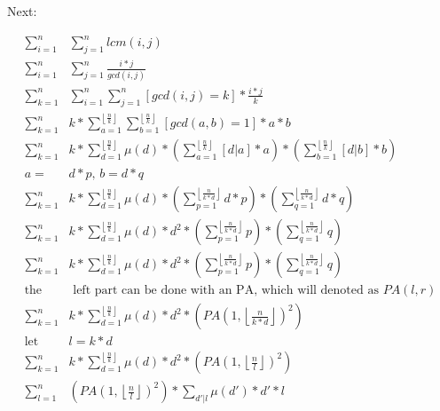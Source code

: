             Next:

            \begin{align*}
                \sum_{i=1}^{n}& \sum_{j=1}^{n} lcm(i,j) \\
                \sum_{i=1}^{n}& \sum_{j=1}^{n} \frac{i*j}{gcd(i,j)} \\
                \sum_{k=1}^{n}& \sum_{i=1}^{n} \sum_{j=1}^{n} [gcd(i,j) = k]*\frac{i*j}{k} \\
                \sum_{k=1}^{n}& k * \sum_{a=1}^{\left\lfloor \frac{n}{k} \right\rfloor} 
                \sum_{b=1}^{\left\lfloor \frac{n}{k} \right\rfloor} [gcd(a,b) = 1]*a*b \\
                \sum_{k=1}^{n}& k * \sum_{d = 1}^{\left\lfloor \frac{n}{k} \right\rfloor} \mu(d) * (\sum_{a=1}^{\left\lfloor \frac{n}{k} \right\rfloor}[d|a]*a) * ( 
                \sum_{b=1}^{\left\lfloor \frac{n}{k} \right\rfloor} [d|b]*b) \\
                a =& d*p\text{, }b = d*q\\
                \sum_{k=1}^{n}& k * \sum_{d = 1}^{\left\lfloor \frac{n}{k} \right\rfloor} \mu(d) * (\sum_{p=1}^{\left\lfloor \frac{n}{k*d} \right\rfloor}d*p) * ( 
                \sum_{q=1}^{\left\lfloor \frac{n}{k*d} \right\rfloor} d*q) \\
            \sum_{k=1}^{n}& k * \sum_{d = 1}^{\left\lfloor \frac{n}{k} \right\rfloor} \mu(d) * d^2 * (\sum_{p=1}^{\left\lfloor \frac{n}{k*d} \right\rfloor}p) * ( 
                \sum_{q=1}^{\left\lfloor \frac{n}{k*d} \right\rfloor} q) \\
                \sum_{k=1}^{n}& k * \sum_{d = 1}^{\left\lfloor \frac{n}{k} \right\rfloor} \mu(d) * d^2 * (\sum_{p=1}^{\left\lfloor \frac{n}{k*d} \right\rfloor}p) * ( 
                \sum_{q=1}^{\left\lfloor \frac{n}{k*d} \right\rfloor} q) \\
                \text{the}&\text{ left part can be done with an PA, which will denoted as } PA(l,r)\\
                \sum_{k=1}^{n}& k * \sum_{d = 1}^{\left\lfloor \frac{n}{k} \right\rfloor} \mu(d) * d^2 * (PA(1,\left\lfloor \frac{n}{k*d} \right\rfloor)^2)  \\
                \text{let }& l = k*d\\
                \sum_{k=1}^{n}& k * \sum_{d = 1}^{\left\lfloor \frac{n}{k} \right\rfloor} \mu(d) * d^2 * (PA(1,\left\lfloor \frac{n}{l} \right\rfloor)^2)  \\
                \sum_{l=1}^{n}& (PA(1,\left\lfloor \frac{n}{l} \right\rfloor)^2) * \sum_{d'|l} \mu(d') * d' * l   \\
            \end{align*}

